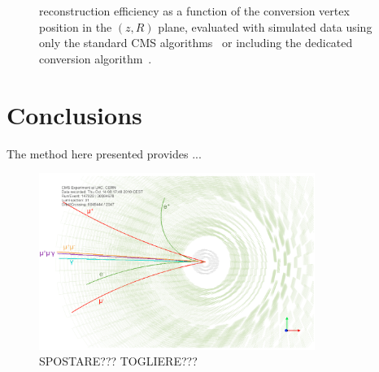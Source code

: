 \documentclass[a4paper]{jpconf}
\begin{document}
\begin{figure}[h]
\centering
{}
\caption{reconstruction efficiency as a function of the conversion vertex position in the $(z,R)$ plane, evaluated with simulated data using only the standard CMS algorithms~  or including the dedicated conversion algorithm~. }
\label{fig:RZCoverage}
\end{figure}



\section{Conclusions}
\label{section_conclusions}


The method here presented provides ...




\begin{figure}[b]
    \centering
    \label{fig:evtdisplay}
    \includegraphics[width=0.8\textwidth]{fig/EvtDisplay.png}
   \caption{SPOSTARE??? TOGLIERE???}
    
    \end{figure} 
\end{document}
